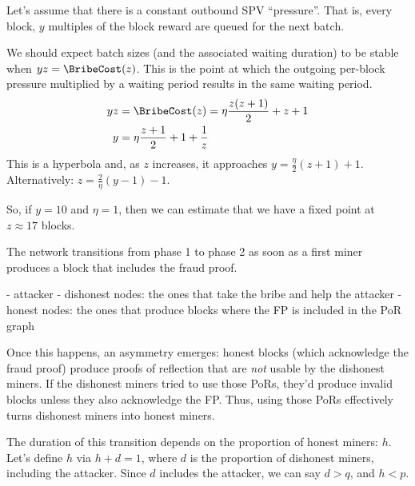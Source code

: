 


Let's assume that there is a constant outbound SPV ``pressure''.
That is, every block, $y$ multiples of the block reward are queued for the next batch.

We should expect batch sizes (and the associated waiting duration) to be stable when $yz = \BribeCost(z)$.
This is the point at which the outgoing per-block pressure multiplied by a waiting period results in the same waiting period.
\begin{align}
    yz &= \BribeCost(z) = \eta \frac{z(z+1)}{2} + z + 1
        \nonumber \\
    y &= \eta \frac{z+1}{2} + 1 + \frac{1}{z}
        \nonumber
\end{align}
This is a hyperbola and, as $z$ increases, it approaches $y = \frac{\eta}{2}(z+1) + 1$.
Alternatively: $z = \frac{2}{\eta}(y - 1) - 1$.

So, if $y = 10$ and $\eta = 1$, then we can estimate that we have a fixed point at $z \approx 17$ blocks.


The network transitions from phase 1 to phase 2 as soon as a first miner produces a block that includes the fraud proof.

- attacker
- dishonest nodes: the ones that take the bribe and help the attacker
- honest nodes: the ones that produce blocks where the FP is included in the PoR graph

Once this happens, an asymmetry emerges: honest blocks (which acknowledge the fraud proof) produce proofs of reflection that are \emph{not} usable by the dishonest miners.
If the dishonest miners tried to use those PoRs, they'd produce invalid blocks unless they also acknowledge the FP.
Thus, using those PoRs effectively turns dishonest miners into honest miners.




The duration of this transition depends on the proportion of honest miners: $h$.
Let's define $h$ via $h + d = 1$, where $d$ is the proportion of dishonest miners, including the attacker.
Since $d$ includes the attacker, we can say $d > q$, and $h < p$.

